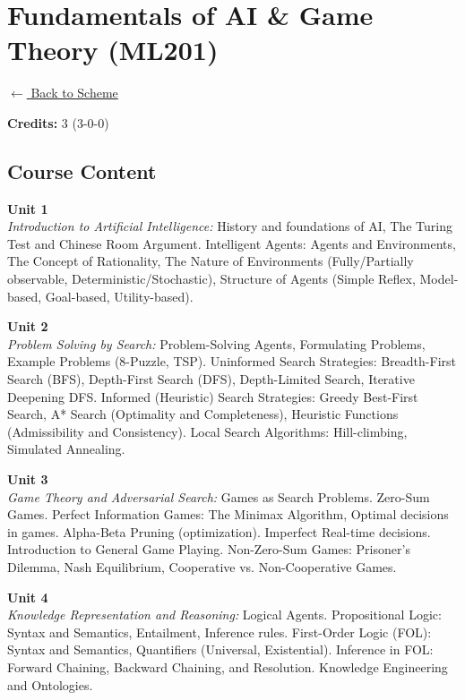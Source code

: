\section*{Fundamentals of AI \& Game Theory (ML201)}
\label{major:ML_1}

\noindent \small{\hyperref[main:scheme]{$\leftarrow$ Back to Scheme}} \vspace{0.5cm}

\noindent \textbf{Credits:} 3 (3-0-0)

\subsection*{Course Content}
\noindent\textbf{Unit 1} \\
\textit{Introduction to Artificial Intelligence:} History and foundations of AI, The Turing Test and Chinese Room Argument. Intelligent Agents: Agents and Environments, The Concept of Rationality, The Nature of Environments (Fully/Partially observable, Deterministic/Stochastic), Structure of Agents (Simple Reflex, Model-based, Goal-based, Utility-based).

\vspace{0.3cm}

\noindent\textbf{Unit 2} \\
\textit{Problem Solving by Search:} Problem-Solving Agents, Formulating Problems, Example Problems (8-Puzzle, TSP). Uninformed Search Strategies: Breadth-First Search (BFS), Depth-First Search (DFS), Depth-Limited Search, Iterative Deepening DFS. Informed (Heuristic) Search Strategies: Greedy Best-First Search, A* Search (Optimality and Completeness), Heuristic Functions (Admissibility and Consistency). Local Search Algorithms: Hill-climbing, Simulated Annealing.

\vspace{0.3cm}

\noindent\textbf{Unit 3} \\
\textit{Game Theory and Adversarial Search:} Games as Search Problems. Zero-Sum Games. Perfect Information Games: The Minimax Algorithm, Optimal decisions in games. Alpha-Beta Pruning (optimization). Imperfect Real-time decisions. Introduction to General Game Playing. Non-Zero-Sum Games: Prisoner's Dilemma, Nash Equilibrium, Cooperative vs. Non-Cooperative Games.

\vspace{0.3cm}

\noindent\textbf{Unit 4} \\
\textit{Knowledge Representation and Reasoning:} Logical Agents. Propositional Logic: Syntax and Semantics, Entailment, Inference rules. First-Order Logic (FOL): Syntax and Semantics, Quantifiers (Universal, Existential). Inference in FOL: Forward Chaining, Backward Chaining, and Resolution. Knowledge Engineering and Ontologies.

